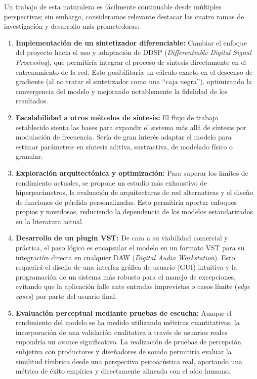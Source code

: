 Un trabajo de esta naturaleza es fácilmente continuable desde múltiples perspectivas; sin embargo, consideramos relevante destacar las cuatro ramas de investigación y desarrollo más prometedoras:

\begin{enumerate}
\item \textbf{Implementación de un sintetizador diferenciable:} Cambiar el enfoque del proyecto hacia el uso y adaptación de DDSP (\textit{Differentiable Digital Signal Processing}), que permitiría integrar el proceso de síntesis directamente en el entrenamiento de la red. Esto posibilitaría un cálculo exacto en el descenso de gradiente (al no tratar el sintetizador como una ``caja negra''), optimizando la convergencia del modelo y mejorando notablemente la fidelidad de los resultados.

\item \textbf{Escalabilidad a otros métodos de síntesis:} El flujo de trabajo establecido sienta las bases para expandir el sistema más allá de síntesis por modulación de frecuencia. Sería de gran interés adaptar el modelo para estimar parámetros en síntesis aditiva, sustractiva, de modelado físico o granular.

\item \textbf{Exploración arquitectónica y optimización:} Para superar los límites de rendimiento actuales, se propone un estudio más exhaustivo de hiperparámetros, la evaluación de arquitecturas de red alternativas y el diseño de funciones de pérdida personalizadas. Esto permitiría aportar enfoques propios y novedosos, reduciendo la dependencia de los modelos estandarizados en la literatura actual.

\item \textbf{Desarrollo de un plugin VST:} De cara a su viabilidad comercial y práctica, el paso lógico es encapsular el modelo en un formato VST para su integración directa en cualquier DAW (\textit{Digital Audio Workstation}). Esto requerirá el diseño de una interfaz gráfica de usuario (GUI) intuitiva y la programación de un sistema más robusto para el manejo de excepciones, evitando que la aplicación falle ante entradas imprevistas o casos límite (\textit{edge cases}) por parte del usuario final.

\item \textbf{Evaluación perceptual mediante pruebas de escucha:} Aunque el rendimiento del modelo se ha medido utilizando métricas cuantitativas, la incorporación de una validación cualitativa a través de usuarios reales supondría un avance significativo. La realización de pruebas de percepción subjetiva con productores y diseñadores de sonido permitiría evaluar la similitud tímbrica desde una perspectiva psicoacústica real, aportando una métrica de éxito empírica y directamente alineada con el oído humano.
\end{enumerate}